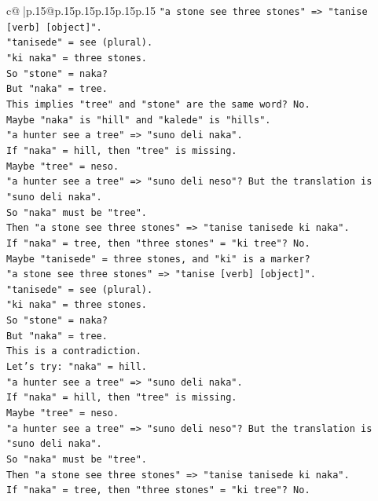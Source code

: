 \documentclass{article}
\begin{document}
{\begin{supertabular}{c@{$\;$}|p{.15\linewidth}@{}p{.15\linewidth}p{.15\linewidth}p{.15\linewidth}p{.15\linewidth}p{.15\linewidth}}
{{{\texttt{"a stone see three stones" => "tanise {[}verb{]} {[}object{]}".} \\
\texttt{"tanisede" = see (plural).} \\
\texttt{"ki naka" = three stones.} \\
\texttt{So "stone" = naka?} \\
\texttt{But "naka" = tree.} \\
\texttt{This implies "tree" and "stone" are the same word? No.} \\
\texttt{Maybe "naka" is "hill" and "kalede" is "hills".} \\
\texttt{"a hunter see a tree" => "suno deli naka".} \\
\texttt{If "naka" = hill, then "tree" is missing.} \\
\texttt{Maybe "tree" = neso.} \\
\texttt{"a hunter see a tree" => "suno deli neso"? But the translation is "suno deli naka".} \\
\texttt{So "naka" must be "tree".} \\
\texttt{Then "a stone see three stones" => "tanise tanisede ki naka".} \\
\texttt{If "naka" = tree, then "three stones" = "ki tree"? No.} \\
\texttt{Maybe "tanisede" = three stones, and "ki" is a marker?} \\
\texttt{"a stone see three stones" => "tanise {[}verb{]} {[}object{]}".} \\
\texttt{"tanisede" = see (plural).} \\
\texttt{"ki naka" = three stones.} \\
\texttt{So "stone" = naka?} \\
\texttt{But "naka" = tree.} \\
\texttt{This is a contradiction.} \\
\texttt{Let's try: "naka" = hill.} \\
\texttt{"a hunter see a tree" => "suno deli naka".} \\
\texttt{If "naka" = hill, then "tree" is missing.} \\
\texttt{Maybe "tree" = neso.} \\
\texttt{"a hunter see a tree" => "suno deli neso"? But the translation is "suno deli naka".} \\
\texttt{So "naka" must be "tree".} \\
\texttt{Then "a stone see three stones" => "tanise tanisede ki naka".} \\
\texttt{If "naka" = tree, then "three stones" = "ki tree"? No.} \\
}}}
\end{supertabular}}
\end{document}
